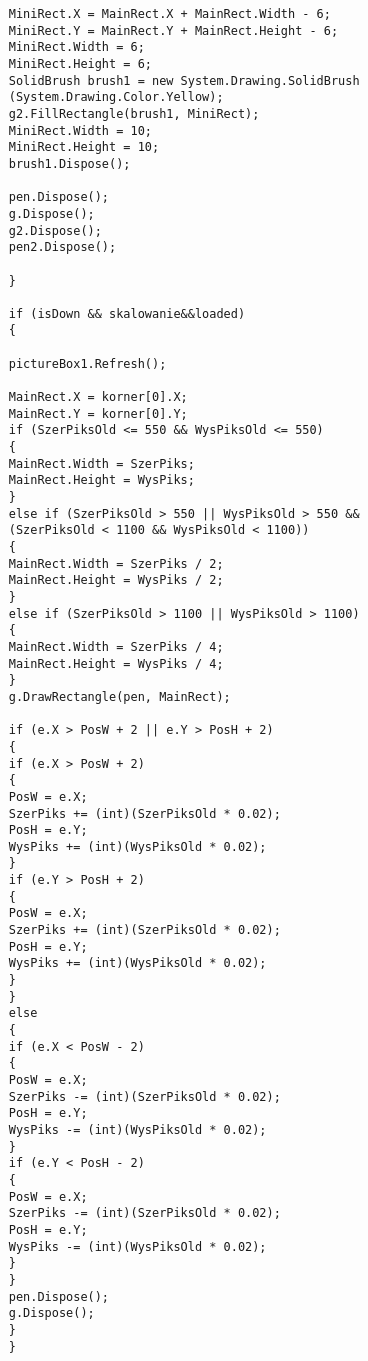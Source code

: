 \begin{itemize}
\begin{lstlisting}
	 MiniRect.X = MainRect.X + MainRect.Width - 6;
	 MiniRect.Y = MainRect.Y + MainRect.Height - 6;
	 MiniRect.Width = 6;
	 MiniRect.Height = 6;
	 SolidBrush brush1 = new System.Drawing.SolidBrush
	 (System.Drawing.Color.Yellow);
	 g2.FillRectangle(brush1, MiniRect);
	 MiniRect.Width = 10;
	 MiniRect.Height = 10;
	 brush1.Dispose();
	 
	 pen.Dispose();
	 g.Dispose();
	 g2.Dispose();
	 pen2.Dispose();
	 
	 }

	 if (isDown && skalowanie&&loaded)
	 {
 
	 pictureBox1.Refresh();
	 
	 MainRect.X = korner[0].X;
	 MainRect.Y = korner[0].Y;
	 if (SzerPiksOld <= 550 && WysPiksOld <= 550)                                                           
	 {
	 MainRect.Width = SzerPiks;
	 MainRect.Height = WysPiks;
	 }
	 else if (SzerPiksOld > 550 || WysPiksOld > 550 && 
	 (SzerPiksOld < 1100 && WysPiksOld < 1100))
	 {
	 MainRect.Width = SzerPiks / 2;
	 MainRect.Height = WysPiks / 2;
	 }
	 else if (SzerPiksOld > 1100 || WysPiksOld > 1100)
	 {
	 MainRect.Width = SzerPiks / 4;
	 MainRect.Height = WysPiks / 4;
	 }                                                                                              
	 g.DrawRectangle(pen, MainRect);
	 	 	 
	 if (e.X > PosW + 2 || e.Y > PosH + 2)
	 {
	 if (e.X > PosW + 2)
	 {
	 PosW = e.X;
	 SzerPiks += (int)(SzerPiksOld * 0.02);
	 PosH = e.Y;
	 WysPiks += (int)(WysPiksOld * 0.02);	 
	 }
	 if (e.Y > PosH + 2)
	 {
	 PosW = e.X;
	 SzerPiks += (int)(SzerPiksOld * 0.02);
	 PosH = e.Y;
	 WysPiks += (int)(WysPiksOld * 0.02);	 
	 }
	 }
	 else
	 {
	 if (e.X < PosW - 2)
	 {
	 PosW = e.X;
	 SzerPiks -= (int)(SzerPiksOld * 0.02);
	 PosH = e.Y;
	 WysPiks -= (int)(WysPiksOld * 0.02);	 
	 }
	 if (e.Y < PosH - 2)
	 {
	 PosW = e.X;
	 SzerPiks -= (int)(SzerPiksOld * 0.02);
	 PosH = e.Y;
	 WysPiks -= (int)(WysPiksOld * 0.02);	 
	 }
	 }	 
	 pen.Dispose();
	 g.Dispose();	 	 
	 }
	 }
	 
	\end{lstlisting}
	

\end{itemize}
